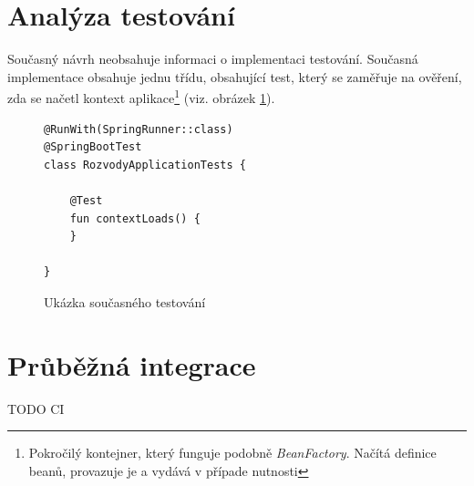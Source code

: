 \section{Analýza testování}\label{analyza:testovani}
    Současný návrh neobsahuje informaci o implementaci testování. Současná implementace obsahuje jednu třídu, obsahující test, který se zaměřuje na ověření, zda se načetl {kontext aplikace}\footnote{Pokročilý kontejner, který funguje podobně \textit{BeanFactory}. Načítá definice beanů, provazuje je a vydává v případe nutnosti} (viz. obrázek \ref{code:test-context-loads1}).
    \begin{figure}
    \begin{verbatim}
@RunWith(SpringRunner::class)
@SpringBootTest
class RozvodyApplicationTests {

    @Test
    fun contextLoads() {
    }

}
        \end{verbatim}
        \caption{Ukázka současného testování} 
        \label{code:test-context-loads1}
        \end{figure}
\section{Průběžná integrace}
    TODO CI
   